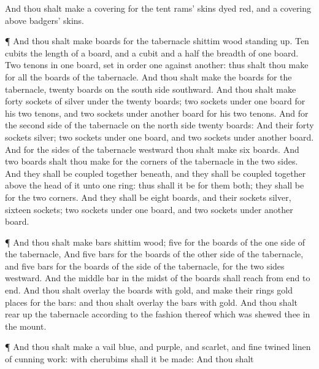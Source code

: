 {And thou shalt
make a
covering for the
tent
{}
rams’
skins dyed
red, and a
covering
above
{}
badgers’
skins.
\par }{\PP {}¶ And thou shalt
make
boards for the
tabernacle
{}
shittim
wood standing
up.
Ten
cubits
{} the
length of a
board, and a
cubit and a
half
{} the
breadth of
one
board.
Two
tenons
{} in
one
board, set in
order
one against
another: thus shalt thou
make for all the
boards of the
tabernacle.
And thou shalt
make the
boards for the
tabernacle,
twenty
boards on the
south
side
southward.
And thou shalt
make
forty
sockets of
silver under the
twenty
boards;
two
sockets under
one
board for his
two
tenons, and
two
sockets under
another
board for his
two
tenons.
And for the
second
side of the
tabernacle on the
north
side
{}
twenty
boards:
And their
forty
sockets
{}
silver;
two
sockets under
one
board, and
two
sockets under
another
board.
And for the
sides of the
tabernacle
westward thou shalt
make
six
boards.
And
two
boards shalt thou
make for the
corners of the
tabernacle in the two
sides.
And they shall be
coupled together
beneath, and they shall be
coupled
together above the
head of it unto
one
ring: thus shall it be for them
both; they shall be for the
two
corners.
And they shall be
eight
boards, and their
sockets
{}
silver,
sixteen
sockets;
two
sockets under
one
board, and
two
sockets under
another
board.
\par }{\PP {}¶ And thou shalt
make
bars
{}
shittim
wood;
five for the
boards of the
one
side of the
tabernacle,
And
five
bars for the
boards of the
other
side of the
tabernacle, and
five
bars for the
boards of the
side of the
tabernacle, for the two
sides
westward.
And the
middle
bar in the
midst of the
boards shall
reach from
end to
end.
And thou shalt
overlay the
boards with
gold, and
make their
rings
{}
gold
{}
places for the
bars: and thou shalt
overlay the
bars with
gold.
And thou shalt rear
up the
tabernacle according to the
fashion thereof which was
shewed thee in the
mount.
\par }{\PP {}¶ And thou shalt
make a
vail
{}
blue, and
purple, and
scarlet, and fine
twined
linen of
cunning
work: with
cherubims shall it be
made:
And thou shalt
}
